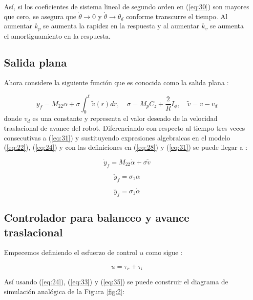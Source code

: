 \documentclass{article}
\begin{document}
Así, si los coeficientes de sistema lineal de segundo orden en (\ref{eq:30}) son mayores que cero, se asegura que $\dot{\theta}\rightarrow0$ y $\dot{\theta}\rightarrow\theta_d$ conforme transcurre el tiempo. Al aumentar $k_p$ se aumenta la rapidez en la respuesta y al aumentar $k_v$ se aumenta el amortiguamiento en la respuesta.

\subsection{Salida plana}
Ahora considere la siguiente función que es conocida como la salida plana \citep{HernandezBook2024}:

\begin{equation}
    \boxed{y_f=M_{22}\alpha+\sigma\int_0^t\tilde{v}(r)dr, \quad \sigma=M_pC_z+\frac{2}{R}I_\phi,\quad \tilde{v}=v-v_d}
    \label{eq:31}
\end{equation}
donde $v_d$ es una constante y representa el valor deseado de la velocidad traslacional de avance del robot. Diferenciando con respecto al tiempo tres veces consecutivas a (\ref{eq:31}) y sustituyendo expresiones algebraicas en el modelo (\ref{eq:22}), (\ref{eq:24}) y con las definiciones en (\ref{eq:28}) y (\ref{eq:31}) se puede llegar a \citep{HernandezBook2024}:

\begin{equation}
    \dot{y}_f=M_{22}\dot{\alpha}+\sigma\tilde{v}
    \label{eq:32}
\end{equation}

\begin{equation}
    \ddot{y}_f=\sigma_1\alpha
    \label{eq:33}
\end{equation}

\begin{equation}
    \dddot{y}_f=\sigma_1\dot{\alpha}
    \label{eq:34}
\end{equation}

\subsection{Controlador para balanceo y avance traslacional}
Empecemos definiendo el esfuerzo de control $u$ como sigue \citep{HernandezBook2024}:

\begin{equation}
    \boxed{u=\tau_r+\tau_l}
    \label{eq:35}
\end{equation}

Así usando (\ref{eq:24}), (\ref{eq:33}) y (\ref{eq:35}) se puede construir el diagrama de simulación analógica de la Figura \ref{fig:2}:
\end{document}
